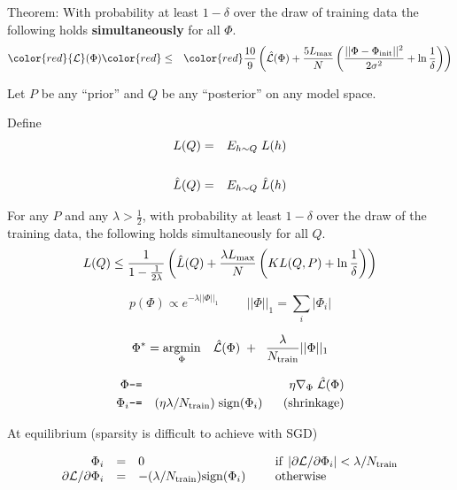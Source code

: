 {\vfill
Theorem: With probability at least $1-\delta$ over the draw of training data the following holds {\bf simultaneously} for all $\Phi$.
\begin{eqnarray*}
   {\color{red} {\cal L}(\Phi)} & {\color{red} \leq} & {\color{red} \frac{10}{9}\parens{\hat{{\cal L}}(\Phi)
   + \frac{5 \lmax}{N}\parens{\frac{||\Phi-\Phi_{\mathrm{init}}||^2}{2\sigma^2} + \ln \frac{1}{\delta}}}}
\end{eqnarray*}


Let $P$ be any ``prior'' and $Q$ be any ``posterior'' on any model space.

\vfill
Define
\begin{eqnarray*}
  L(Q) & =  &E_{h \sim Q}\;L(h) \\
  \\
  \hat{L}(Q) & =  &E_{h \sim Q}\;\hat{L}(h)
\end{eqnarray*}


\vfill
For any $P$ and any $\lambda > \frac{1}{2}$, with probability
at least $1-\delta$ over the draw of the training data, the following holds simultaneously for all $Q$.
\vfill
$$L(Q) \leq \frac{1}{1-\frac{1}{2\lambda}}\left(\hat{L}(Q) + \frac{\lambda L_{\max}}{N}\left(KL(Q,P) + \ln \frac{1}{\delta}\right)\right)$$



$$p(\Phi) \propto e^{-\lambda ||\Phi||_1} \;\;\;\;\;\;\;\;||\Phi||_1 = \sum_i |\Phi_i|$$

$$\Phi^* = \operatorname*{argmin}_\Phi \; \;\;\hat{\cal L}(\Phi) \;+ \; \;\frac{\lambda}{N_{\mathrm{train}}}||\Phi||_1$$

\begin{eqnarray*}
  \Phi & \mbox{\tt -=} & \eta \nabla_\Phi \; \hat{\cal L}(\Phi) \\
  \Phi_i & \mbox{\tt -=} & (\eta\lambda/N_{\mathrm{train}})\; \mathrm{sign}(\Phi_i) \;\;\;\;\;\;\mbox{(shrinkage)}
\end{eqnarray*}

\vfill
At equilibrium \hfill (sparsity is difficult to achieve with SGD)

$$\begin{array}{rcll}
\Phi_i &  = & 0  & \;\;\;\;\;\mbox{if} \;\left|\partial {\cal L} /\partial \Phi_i\right| <  \lambda/N_{\mathrm{train}} \\
\partial {\cal L} /\partial \Phi_i & = &  -(\lambda/N_{\mathrm{train}}) \mathrm{sign}(\Phi_i) &\;\;\;\;\; \mbox{otherwise}
\end{array}$$


}
